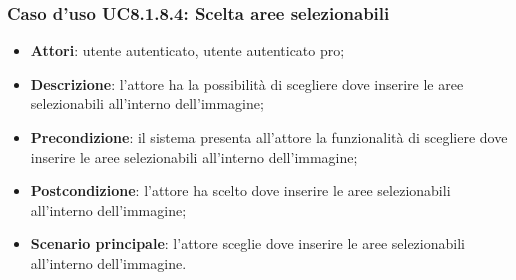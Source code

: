 \subsubsection{Caso d'uso UC8.1.8.4: Scelta aree selezionabili}
\begin{itemize}
	\item \textbf{Attori}: utente autenticato, utente autenticato pro;
	\item \textbf{Descrizione}: l'attore ha la possibilità di scegliere dove inserire le aree selezionabili all'interno dell'immagine;
	\item \textbf{Precondizione}: il sistema presenta all'attore la funzionalità di scegliere dove inserire le aree selezionabili all'interno dell'immagine; 	
	\item \textbf{Postcondizione}: l'attore ha scelto dove inserire le aree selezionabili all'interno dell'immagine;
	\item \textbf{Scenario principale}: l'attore sceglie dove inserire le aree selezionabili all'interno dell'immagine. 	
\end{itemize}

